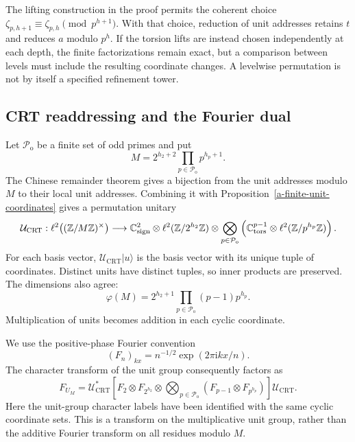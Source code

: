 The lifting construction in the proof permits the coherent choice
$\zeta_{p,h+1}\equiv\zeta_{p,h}\pmod{p^{h+1}}$. With that choice,
reduction of unit addresses retains $t$ and reduces $a$ modulo $p^h$.
If the torsion lifts are instead chosen independently at each depth, the
finite factorizations remain exact, but a comparison between levels must
include the resulting coordinate changes. A levelwise permutation is
not by itself a specified refinement tower.



\subsection{CRT readdressing and the Fourier dual}

Let $\mathcal P_{\mathrm o}$ be a finite set of odd primes and put
\[
 M=2^{h_2+2}\prod_{p\in\mathcal P_{\mathrm o}}p^{h_p+1}.
\]
The Chinese remainder theorem gives a bijection from the unit addresses
modulo $M$ to their local unit addresses. Combining it with
Proposition~\ref{a-finite-unit-coordinates} gives a permutation unitary
\begin{equation}
 \mathcal U_{\mathrm{CRT}}:
 \ell^2\bigl((\mathbb Z/M\mathbb Z)^\times\bigr)
 \longrightarrow
 \mathbb C^2_{\mathrm{sign}}\otimes\ell^2(\mathbb Z/2^{h_2}\mathbb Z)
 \otimes\bigotimes_{p\in\mathcal P_{\mathrm o}}
 \left(\mathbb C^{p-1}_{\mathrm{tors}}\otimes\ell^2(\mathbb Z/p^{h_p}\mathbb Z)\right).
 \label{a-finite-crt}
\end{equation}
For each basis vector, $\mathcal U_{\mathrm{CRT}}|u\rangle$ is the basis
vector with its unique tuple of coordinates. Distinct units have distinct
tuples, so inner products are preserved. The dimensions also agree:
\[
 \varphi(M)=2^{h_2+1}\prod_{p\in\mathcal P_{\mathrm o}}(p-1)p^{h_p}.
\]
Multiplication of units becomes addition in each cyclic coordinate.

We use the positive-phase Fourier convention
\begin{equation}
 (F_n)_{k x}=n^{-1/2}\exp(2\pi\mathrm{i}kx/n).
 \label{a-finite-fourier-convention}
\end{equation}
The character transform of the unit group consequently factors as
\begin{equation}
 F_{U_M}=\mathcal U_{\mathrm{CRT}}^*
 \left[F_2\otimes F_{2^{h_2}}\otimes
 \bigotimes_{p\in\mathcal P_{\mathrm o}}(F_{p-1}\otimes F_{p^{h_p}})
 \right]\mathcal U_{\mathrm{CRT}}.
 \label{a-finite-unit-fourier}
\end{equation}
Here the unit-group character labels have been identified with the same
cyclic coordinate sets. This is a transform on the multiplicative unit
group, rather than the additive Fourier transform on all residues
modulo $M$.

